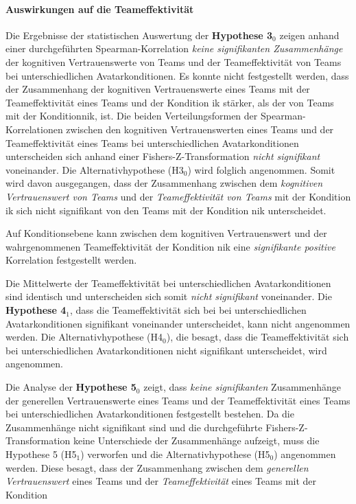 \documentclass[a4paper,11pt]{article}%
\renewcommand{\\}{\vspace*{0.5\baselineskip} \newline}
\begin{document}
\paragraph{Auswirkungen auf die Teameffektivität}
Die Ergebnisse der statistischen Auswertung der \textbf{Hypothese 3$_{0}$} zeigen anhand einer durchgeführten Spearman-Korrelation \textit{keine signifikanten Zusammenhänge} der kognitiven Vertrauenswerte von Teams und der Teameffektivität von Teams bei unterschiedlichen Avatarkonditionen. Es konnte nicht festgestellt werden, dass der Zusammenhang der kognitiven Vertrauenswerte eines Teams mit der Teameffektivität eines Teams und der Kondition \ac{ik} stärker, als der von Teams mit der Kondition\newline \ac{nik}, ist. Die beiden Verteilungsformen der Spearman-Korrelationen zwischen den kognitiven Vertrauenswerten eines Teams und der Teameffektivität eines Teams bei unterschiedlichen Avatarkonditionen unterscheiden sich anhand einer Fishers-Z-Transformation \textit{nicht signifikant} voneinander.
Die Alternativhypothese (H3$_{0}$) wird folglich angenommen.
Somit wird davon ausgegangen, dass der Zusammenhang zwischen dem \textit{kognitiven Vertrauenswert von Teams} und der \textit{Teameffektivität von Teams} mit der Kondition \ac{ik} sich nicht signifikant von den Teams mit der Kondition \ac{nik} unterscheidet.

Auf Konditionsebene kann zwischen dem kognitiven Vertrauenswert und der wahrgenommenen Teameffektivität der Kondition \ac{nik} eine \textit{signifikante positive} Korrelation festgestellt werden. 

Die Mittelwerte der Teameffektivität bei unterschiedlichen Avatarkonditionen sind identisch und unterscheiden sich somit \textit{nicht signifikant} voneinander. Die \textbf{Hypothese 4$_{1}$}, dass die Teameffektivität sich bei bei unterschiedlichen Avatarkonditionen signifikant voneinander unterscheidet, kann nicht angenommen werden. Die Alternativhypothese (H4$_{0}$), die besagt, dass die Teameffektivität sich bei unterschiedlichen Avatarkonditionen nicht signifikant unterscheidet, wird angenommen.\newline

Die Analyse der \textbf{Hypothese 5$_{0}$} zeigt, dass \textit{keine signifikanten} Zusammenhänge der generellen Vertrauenswerte eines Teams und der Teameffektivität eines Teams bei unterschiedlichen Avatarkonditionen festgestellt bestehen. Da die Zusammenhänge nicht signifikant sind und die durchgeführte Fishers-Z-Transformation keine Unterschiede der Zusammenhänge aufzeigt, muss die Hypothese 5 (H5$_{1}$) verworfen und die Alternativhypothese (H5$_{0}$) angenommen werden. Diese besagt, dass der Zusammenhang zwischen dem \textit{generellen Vertrauenswert} eines Teams und der \textit{Teameffektivität} eines Teams mit der Kondition 
\end{document}
